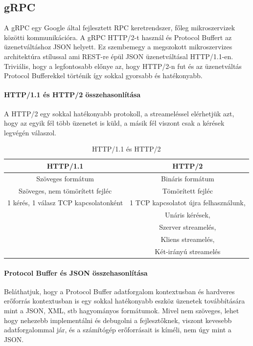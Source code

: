 \subsection{gRPC}
A gRPC \cite{gRPC} egy Google által fejlesztett RPC keretrendszer, főleg mikroszervizek közötti kommunikációra.
A gRPC HTTP/2-t használ és Protocol Buffert az üzenetváltáshoz JSON helyett. Ez szembemegy a megszokott mikroszervizes architektúra stílussal ami REST-re épül JSON üzenetváltásal HTTP/1.1-en.
Triviális, hogy a legfontosabb előnye az, hogy HTTP/2-n fut és az üzenetváltás Protocol Bufferekkel történik így sokkal gyorsabb és hatékonyabb.


\paragraph{HTTP/1.1 és HTTP/2 összehasonlítása}
A HTTP/2 egy sokkal hatékonyabb protokoll, a streameléssel elérhetjük azt, hogy az egyik fél több üzenetet is küld, a másik fél viszont csak a kérések legvégén válaszol.
\begin{table}[h]
    \centering
    \caption{HTTP/1.1 és HTTP/2}
    \label{tab:http}
    \begin{tabular}{|c|c|}
        \hline
        HTTP/1.1 & HTTP/2 \\
        \hline
        Szöveges formátum & Bináris formátum \\
        \hline
        Szöveges, nem tömörített fejléc & Tömörített fejléc \\
        \hline
        1 kérés, 1 válasz TCP kapcsolatonként & 1 TCP kapcsolatot újra felhasználunk,\\
        & Unáris kérések,\\
        & Szerver streamelés,\\
        & Kliens streamelés,\\
        & Két-irányú streamelés\\
        \hline
    \end{tabular}
\end{table}

\paragraph{Protocol Buffer és JSON összehasonlítása}

Beláthatjuk, hogy a Protocol Buffer adatforgalom kontextusban és hardveres erőforrás kontextusban is egy sokkal hatékonyabb eszköz üzenetek továbbítására mint a JSON, XML, stb hagyományos formátumok.
Mivel nem szöveges, lehet hogy nehezebb implementálni és debugolni a fejlesztőknek, viszont kevesebb adatforgalommal jár, és a számítógép erőforrásait is kíméli, nem úgy mint a JSON.

